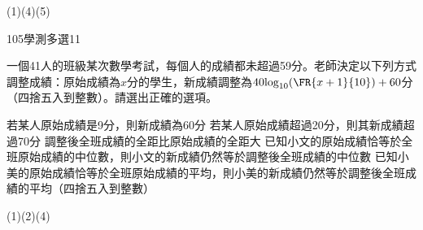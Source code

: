 \begin{QUESTIONS}
\begin{QUESTION}
        \begin{QFROMS}
        \end{QFROMS}
        \begin{QTAGS}\end{QTAGS}
        \begin{QANS}
            (1)(4)(5)
        \end{QANS}
        \begin{QSOLLIST}
        \end{QSOLLIST}
        \begin{QEMPTYSPACE}
        \end{QEMPTYSPACE}
    \end{QUESTION}
    \begin{QUESTION}
        \begin{ExamInfo}{105}{學測}{多選}{11}
        \end{ExamInfo}
        \begin{ExamAnsRateInfo}{47}{67}{49}{25}
        \end{ExamAnsRateInfo}
        \begin{QBODY}
			一個41人的班級某次數學考試，每個人的成績都未超過59分。老師決定以下列方式調整成績：原始成績為$x$分的學生，新成績調整為$40{{\log }_{10}}(\FR{x+1}{10})+60$分（四捨五入到整數）。請選出正確的選項。
			\begin{QOPS}
				\QOP 若某人原始成績是9分，則新成績為60分
				\QOP 若某人原始成績超過20分，則其新成績超過70分
				\QOP 調整後全班成績的全距比原始成績的全距大
				\QOP 已知小文的原始成績恰等於全班原始成績的中位數，則小文的新成績仍然等於調整後全班成績的中位數
				\QOP 已知小美的原始成績恰等於全班原始成績的平均，則小美的新成績仍然等於調整後全班成績的平均（四捨五入到整數）
			\end{QOPS}
		\end{QBODY}
        \begin{QFROMS}
        \end{QFROMS}
        \begin{QTAGS}\end{QTAGS}
        \begin{QANS}
            (1)(2)(4)
        \end{QANS}
        \begin{QSOLLIST}
        \end{QSOLLIST}
        \begin{QEMPTYSPACE}
        \end{QEMPTYSPACE}
    \end{QUESTION}
    \begin{QUESTION}

\end{QUESTION}
\end{QUESTIONS}
